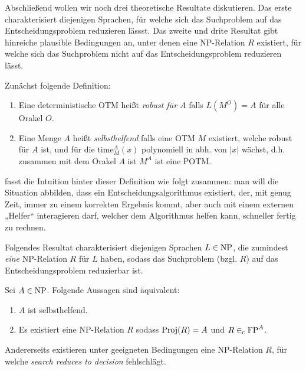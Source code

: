 Abschließend wollen wir noch drei theoretische Resultate diskutieren. Das erste charakterisiert diejenigen Sprachen, für welche sich das Suchproblem auf das Entscheidungsproblem reduzieren lässst.
Das zweite und drite Resultat gibt hinreiche plausible Bedingungen an, unter denen eine NP-Relation $R$ existiert, für welche sich das Suchproblem nicht auf das Entscheidungsproblem reduzieren lässt.

Zunächst folgende Definition:

\begin{definition}
    \begin{enumerate}
        \item Eine deterministische OTM heißt \emph{robust für $A$} falls $L(M^O)=A$ für alle Orakel $O$.
        \item Eine Menge $A$ heißt \emph{selbsthelfend} falls eine OTM $M$ existiert, welche robust für $A$ ist, und für die $\mathrm{time}_M^A(x)$ polynomiell in abh. von $|x|$ wächst, d.h. zusammen mit dem Orakel $A$ ist $M^A$ ist eine POTM.\qedhere
    \end{enumerate}
\end{definition}

\citeauthor{balcazar_self_1989} fasst die Intuition hinter dieser Definition wie folgt zusammen: man will die Situation abbilden, dass ein Entscheidungsalgorithmus existiert, der, mit genug Zeit, immer zu einem korrekten Ergebnis kommt, aber auch mit einem externen „Helfer“ interagieren darf, welcher dem Algorithmus helfen kann, schneller fertig zu rechnen.

Folgendes Resultat charakterisiert diejenigen Sprachen $L\in\mathrm{NP}$, die zumindest \emph{eine} NP-Relation $R$ für $L$ haben, sodass das Suchproblem (bzgl. $R$) auf das Entscheidungsproblem reduzierbar ist.

\begin{theorem}
    Sei $A\in \mathrm{NP}$. Folgende Aussagen sind äquivalent:
    \begin{enumerate}
        \item $A$ ist selbsthelfend.
        \item Es existiert eine NP-Relation $R$ sodass $\operatorname{Proj}(R)=A$ und $R\in_\mathrm{c} \mathrm{FP}^{A}$.
    \end{enumerate}
\end{theorem}

Andererseits existieren unter geeigneten Bedingungen eine NP-Relation $R$, für welche \emph{search reduces to decision} fehlschlägt.

